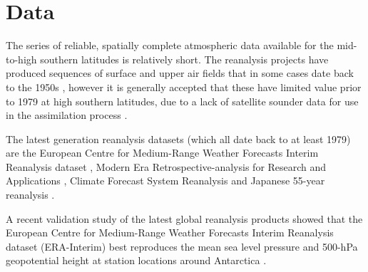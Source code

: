 \section{Data}\label{s:data}

The series of reliable, spatially complete atmospheric data available for the mid-to-high southern latitudes is relatively short. The reanalysis projects have produced sequences of surface and upper air fields that in some cases date back to the 1950s \citep{Kistler2001,Uppala2005,Kobayashi2015}, however it is generally accepted that these have limited value prior to 1979 at high southern latitudes, due to a lack of satellite sounder data for use in the assimilation process \citep{Hines2000}.

The latest generation reanalysis datasets (which all date back to at least 1979) are the European Centre for Medium-Range Weather Forecasts Interim Reanalysis dataset \citep[ERA-Interim;][]{Dee2011}, Modern Era Retrospective-analysis for Research and Applications \citep[Merra;][]{Rienecker2011}, Climate Forecast System Reanalysis \citep[CFSR;][]{Saha2010} and Japanese 55-year reanalysis \citep[JRA-55;][]{Kobayashi2015}. 

A recent validation study of the latest global reanalysis products showed that the European Centre for Medium-Range Weather Forecasts Interim Reanalysis dataset (ERA-Interim) best reproduces the mean sea level pressure and 500-hPa geopotential height at station locations around Antarctica \citep{Bracegirdle2012}.